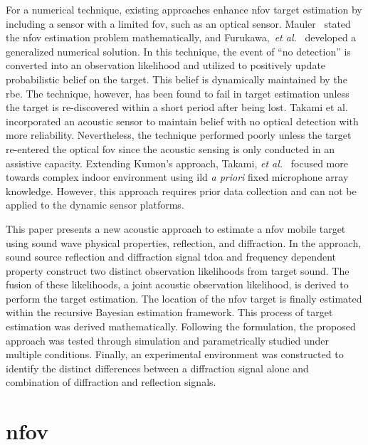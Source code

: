 \documentclass[letterpaper, 10 pt, conference]{ieeeconf}  %
\begin{document}
For a numerical technique, existing approaches enhance \gls{nfov} target estimation by including a sensor with a limited \gls{fov}, such as an optical sensor. Mauler~\cite{mau03} stated the \gls{nfov} estimation problem mathematically, and Furukawa,~{\it et al.}~\cite{fur06,fur12} developed a generalized numerical solution.  In this technique, the event of ``no detection'' is converted into an observation likelihood and utilized to positively update probabilistic belief on the target. This belief is dynamically maintained by the \gls{rbe}.  The technique, however, has been found to fail in target estimation unless the target is re-discovered within a short period after being lost. Takami et al.~\cite{takami2015ar} incorporated an acoustic sensor to maintain belief with no optical detection with more reliability. Nevertheless, the technique performed poorly unless the target re-entered the optical \gls{fov} since the acoustic sensing is only conducted in an assistive capacity. Extending Kumon's approach, Takami, {\it et al.}~\cite{takami2015fsr} focused more towards complex indoor environment using \gls{ild} {\it a priori} fixed microphone array knowledge. However, this approach requires prior data collection and can not be applied to the dynamic sensor platforms.

This paper presents a new acoustic approach to estimate a \gls{nfov} mobile target using sound wave physical properties, reflection, and diffraction. In the approach, sound source reflection and diffraction signal \gls{tdoa} and frequency dependent property construct two distinct observation likelihoods from target sound. The fusion of these likelihoods, a joint acoustic observation likelihood, is derived to perform the target estimation. The location of the \gls{nfov} target is finally estimated within the recursive Bayesian estimation framework. This process of target estimation was derived mathematically. Following the formulation, the proposed approach was tested through simulation and parametrically studied under multiple conditions. Finally, an experimental environment was constructed to identify the distinct differences between a diffraction signal alone and combination of diffraction and reflection signals.

\section{\acrfull{nfov}}
\end{document}
